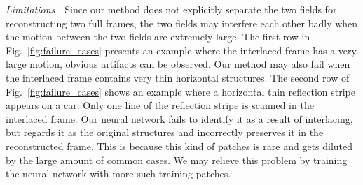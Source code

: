 \documentclass[acmtog]{acmart}
\begin{document}
\vspace{0.15in}
\noindent\emph{Limitations}\,\,\,\,
Since our method does not explicitly separate the two fields for reconstructing
two full frames, the two fields may interfere each other 
badly when the motion between the two fields are extremely large. The first row
in Fig.~\ref{fig:failure_cases} presents an example where the interlaced frame
has a very large motion, obvious artifacts can be
observed. Our method may also fail when the interlaced frame contains very thin
horizontal structures. The second row of Fig.~\ref{fig:failure_cases} shows an
example where a horizontal thin reflection stripe appears on a car. Only one line
of the reflection stripe is scanned in the interlaced frame. Our neural network
fails to identify it as a result of interlacing, but regards it as the original
structures and incorrectly preserves it in the reconstructed frame. This is
because this kind of patches is rare and gets diluted by the large amount of
common cases. We may relieve this problem by training the neural network with 
more such training patches. 
\end{document}
